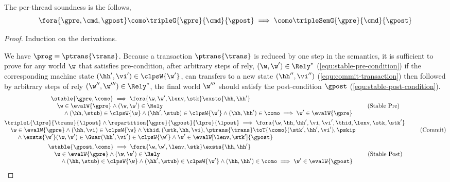 \begin{theorem}
\label{thm:per-thread-soundness}
The per-thread soundness is the follows,
\[
    \fora{\gpre, \cmd, \gpost}
    \como \tripleG{\gpre}{\cmd}{\gpost} 
    \implies 
    \como \tripleSemG{\gpre}{\cmd}{\gpost} 
\]
\end{theorem}
\begin{proof}
Induction on the derivations.


We have \( \prog \equiv \ptrans{\trans} \).
Because a transaction \( \ptrans{\trans} \) is reduced by one step in the semantics, it is sufficient to prove for any world \(\w\) that satisfies pre-condition, after arbitrary steps of rely, \ie \( (\w, \w') \in \Rely^{*} \) (\cref{equ:stable-pre-condition}) if the corresponding machine state \((\hh',\vi') \in \clpsW{\w'}\), can transfers to a new state \((\hh'',\vi'')\) (\cref{equ:commit-transaction}) then followed by arbitrary steps of rely \((\w'',\w''') \in \Rely^{*} \), the final world \( \w''' \) should satisfy the post-condition \(\gpost\) (\cref{equ:stable-post-condition}).
\begin{gather}
    \begin{array}{@{}l}
    \stable{\gpre, \como}  
    \implies 
    \fora{\w, \w',\lenv, \stk}  
    \exsts{ \hh, \hh' } \\
    \quad \w \in \evalW{\gpre} 
    \land (\w, \w') \in \Rely \\
    \qquad {} \land (\hh, \stub) \in \clpsW{\w}
    \land (\hh', \stub) \in \clpsW{\w'}
    \land (\hh, \hh') \in \como
    \implies \w' \in \evalW{\gpre} 
    \end{array} \tag{Stable Pre} \label{equ:stable-pre-condition} \\
%
    \begin{array}{@{}l}
    \tripleL{\lpre}{\trans}{\lpost}
    \land \repartition{\gpre}{\gpost}{\lpre}{\lpost}
    \implies 
    \fora{\w, \hh, \hh', \vi, \vi', \thid, \lenv, \stk, \stk'} \\
    \quad \w \in \evalW{\gpre}
    \land (\hh, \vi) \in \clpsW{\w} 
    \land \thid, (\stk, \hh, \vi), \ptrans{\trans} 
    \toT{\como} (\stk', \hh', \vi'), \pskip  \\
    \qquad {} \land \exsts{\w'}
    (\w, \w') \in \Guar
    (\hh', \vi') \in \clpsW{\w'} 
    \land \w' \in \evalW[\lenv, \stk']{\gpost} 
    \end{array} \label{equ:commit-transaction} \tag{Commit} \\
%
    \begin{array}{@{}l}
    \stable{\gpost, \como}  
    \implies 
    \fora{\w, \w',\lenv, \stk}  
    \exsts{ \hh, \hh' } \\
    \quad \w \in \evalW{\gpre} 
    \land (\w, \w') \in \Rely \\
    \qquad {} \land (\hh, \stub) \in \clpsW{\w}
    \land (\hh', \stub) \in \clpsW{\w'}
    \land (\hh, \hh') \in \como
    \implies \w' \in \evalW{\gpost} 
    \end{array} \tag{Stable Post} \label{equ:stable-post-condition} 
\end{gather}


\end{proof}
